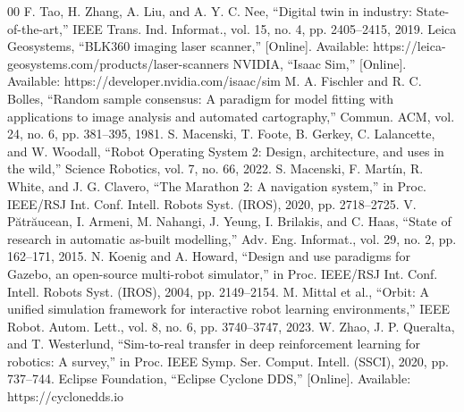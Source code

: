 \documentclass[conference]{IEEEtran}
\begin{document}
\begin{thebibliography}{00}
 F. Tao, H. Zhang, A. Liu, and A. Y. C. Nee,
``Digital twin in industry: State-of-the-art,'' IEEE Trans. Ind.
Informat., vol. 15, no. 4, pp. 2405--2415, 2019.
 Leica Geosystems, ``BLK360 imaging laser scanner,''
[Online]. Available: https://leica-geosystems.com/products/laser-scanners
 NVIDIA, ``Isaac Sim,'' [Online]. Available:
https://developer.nvidia.com/isaac/sim
 M. A. Fischler and R. C. Bolles, ``Random sample
consensus: A paradigm for model fitting with applications to image
analysis and automated cartography,'' Commun. ACM, vol. 24, no. 6,
pp. 381--395, 1981.
 S. Macenski, T. Foote, B. Gerkey, C. Lalancette, and
W. Woodall, ``Robot Operating System 2: Design, architecture, and uses
in the wild,'' Science Robotics, vol. 7, no. 66, 2022.
 S. Macenski, F. Mart\'in, R. White, and J. G. Clavero,
``The Marathon 2: A navigation system,'' in Proc. IEEE/RSJ Int. Conf.
Intell. Robots Syst. (IROS), 2020, pp. 2718--2725.
 V. P\u{a}tr\u{a}ucean, I. Armeni, M. Nahangi,
J. Yeung, I. Brilakis, and C. Haas, ``State of research in automatic
as-built modelling,'' Adv. Eng. Informat., vol. 29, no. 2,
pp. 162--171, 2015.
 N. Koenig and A. Howard, ``Design and use paradigms
for Gazebo, an open-source multi-robot simulator,'' in Proc. IEEE/RSJ
Int. Conf. Intell. Robots Syst. (IROS), 2004, pp. 2149--2154.
 M. Mittal et al., ``Orbit: A unified simulation
framework for interactive robot learning environments,'' IEEE Robot.
Autom. Lett., vol. 8, no. 6, pp. 3740--3747, 2023.
 W. Zhao, J. P. Queralta, and T. Westerlund,
``Sim-to-real transfer in deep reinforcement learning for robotics: A
survey,'' in Proc. IEEE Symp. Ser. Comput. Intell. (SSCI), 2020,
pp. 737--744.
 Eclipse Foundation, ``Eclipse Cyclone DDS,''
[Online]. Available: https://cyclonedds.io
\end{thebibliography}
\end{document}
